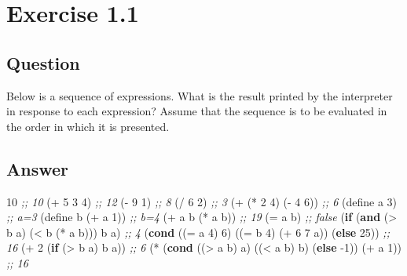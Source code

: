 \documentclass[
]{article}
\newenvironment{Shaded}{}{}
\newcommand{\CommentTok}[1]{\textcolor[rgb]{0.38,0.63,0.69}{\textit{#1}}}
\newcommand{\DecValTok}[1]{\textcolor[rgb]{0.25,0.63,0.44}{#1}}
\newcommand{\ExtensionTok}[1]{#1}
\newcommand{\FunctionTok}[1]{\textcolor[rgb]{0.02,0.16,0.49}{#1}}
\newcommand{\KeywordTok}[1]{\textcolor[rgb]{0.00,0.44,0.13}{\textbf{#1}}}
\newcommand{\NormalTok}[1]{#1}
\newcommand{\OperatorTok}[1]{\textcolor[rgb]{0.40,0.40,0.40}{#1}}
\begin{document}
\hypertarget{exercise-1.1}{%
\section{Exercise 1.1}\label{exercise-1.1}}

\hypertarget{question}{%
\subsection{Question}\label{question}}

Below is a sequence of expressions. What is the result printed by the
interpreter in response to each expression? Assume that the sequence is
to be evaluated in the order in which it is presented.

\hypertarget{answer}{%
\subsection{Answer}\label{answer}}

\begin{Shaded}
\begin{Highlighting}[numbers=left,,]
\DecValTok{10} \CommentTok{;; 10}
\NormalTok{(}\OperatorTok{+} \DecValTok{5} \DecValTok{3} \DecValTok{4}\NormalTok{) }\CommentTok{;; 12}
\NormalTok{(}\OperatorTok{{-}} \DecValTok{9} \DecValTok{1}\NormalTok{) }\CommentTok{;; 8}
\NormalTok{(}\OperatorTok{/} \DecValTok{6} \DecValTok{2}\NormalTok{) }\CommentTok{;; 3}
\NormalTok{(}\OperatorTok{+}\NormalTok{ (}\OperatorTok{*} \DecValTok{2} \DecValTok{4}\NormalTok{) (}\OperatorTok{{-}} \DecValTok{4} \DecValTok{6}\NormalTok{)) }\CommentTok{;; 6}
\NormalTok{(}\ExtensionTok{define}\FunctionTok{ a }\DecValTok{3}\NormalTok{) }\CommentTok{;; a=3}
\NormalTok{(}\ExtensionTok{define}\FunctionTok{ b }\NormalTok{(}\OperatorTok{+}\NormalTok{ a }\DecValTok{1}\NormalTok{)) }\CommentTok{;; b=4}
\NormalTok{(}\OperatorTok{+}\NormalTok{ a b (}\OperatorTok{*}\NormalTok{ a b)) }\CommentTok{;; 19}
\NormalTok{(}\OperatorTok{=}\NormalTok{ a b) }\CommentTok{;; false}
\NormalTok{(}\KeywordTok{if}\NormalTok{ (}\KeywordTok{and}\NormalTok{ (}\OperatorTok{\textgreater{}}\NormalTok{ b a) (}\OperatorTok{\textless{}}\NormalTok{ b (}\OperatorTok{*}\NormalTok{ a b)))}
\NormalTok{    b}
\NormalTok{    a) }\CommentTok{;; 4}
\NormalTok{(}\KeywordTok{cond}\NormalTok{ ((}\OperatorTok{=}\NormalTok{ a }\DecValTok{4}\NormalTok{) }\DecValTok{6}\NormalTok{)}
\NormalTok{      ((}\OperatorTok{=}\NormalTok{ b }\DecValTok{4}\NormalTok{) (}\OperatorTok{+} \DecValTok{6} \DecValTok{7}\NormalTok{ a))}
\NormalTok{      (}\KeywordTok{else} \DecValTok{25}\NormalTok{)) }\CommentTok{;; 16}
\NormalTok{(}\OperatorTok{+} \DecValTok{2}\NormalTok{ (}\KeywordTok{if}\NormalTok{ (}\OperatorTok{\textgreater{}}\NormalTok{ b a) b a)) }\CommentTok{;; 6}
\NormalTok{(}\OperatorTok{*}\NormalTok{ (}\KeywordTok{cond}\NormalTok{ ((}\OperatorTok{\textgreater{}}\NormalTok{ a b) a)}
\NormalTok{         ((}\OperatorTok{\textless{}}\NormalTok{ a b) b)}
\NormalTok{         (}\KeywordTok{else}\NormalTok{ {-}}\DecValTok{1}\NormalTok{))}
\NormalTok{   (}\OperatorTok{+}\NormalTok{ a }\DecValTok{1}\NormalTok{)) }\CommentTok{;; 16}
\end{Highlighting}
\end{Shaded}
\end{document}
